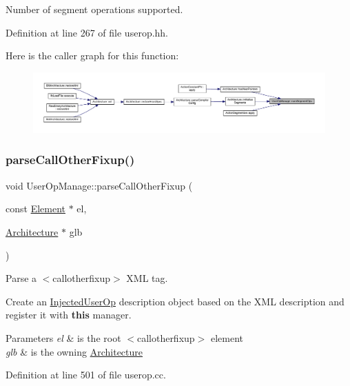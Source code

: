 Number of segment operations supported. 



Definition at line 267 of file userop.\+hh.

Here is the caller graph for this function\+:
\nopagebreak
\begin{figure}[H]
\begin{center}
\leavevmode
\includegraphics[width=350pt]{class_user_op_manage_abe119d872d491a6ce772c19fc15ace18_icgraph}
\end{center}
\end{figure}
\mbox{\label{class_user_op_manage_ad692cedd6253a601e45116ed8dc402bd}} 
\subsubsection{\texorpdfstring{parseCallOtherFixup()}{parseCallOtherFixup()}}
{\footnotesize\ttfamily void User\+Op\+Manage\+::parse\+Call\+Other\+Fixup (\begin{DoxyParamCaption}\item[{const \mbox{\hyperlink{class_element}{Element}} $\ast$}]{el,  }\item[{\mbox{\hyperlink{class_architecture}{Architecture}} $\ast$}]{glb }\end{DoxyParamCaption})}



Parse a $<$callotherfixup$>$ X\+ML tag. 

Create an \mbox{\hyperlink{class_injected_user_op}{Injected\+User\+Op}} description object based on the X\+ML description and register it with {\bfseries{this}} manager. 
\begin{DoxyParams}{Parameters}
{\em el} & is the root $<$callotherfixup$>$ element \\
\hline
{\em glb} & is the owning \mbox{\hyperlink{class_architecture}{Architecture}} \\
\hline
\end{DoxyParams}


Definition at line 501 of file userop.\+cc.

